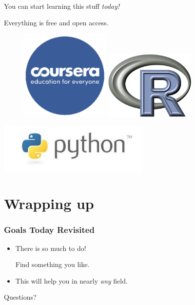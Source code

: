 \documentclass{beamer}
\begin{document}
\begin{frame}


You can start learning this stuff \emph{today!}

Everything is free and open access.

\begin{figure}
   \includegraphics[width=0.4\textwidth]{figs/coursera.png}
   \hfill
   \includegraphics[width=0.4\textwidth]{figs/r.png}
\end{figure}

\centerline{\includegraphics[height=1in]{figs/python.jpeg}}

\end{frame}
\section{Wrapping up}
\begin{frame}


\frametitle{Goals Today Revisited}

\begin{itemize}
\item There is so much to do!

Find something you like.

\item This will help you in nearly \emph{any} field.
\end{itemize}


\end{frame}
\begin{frame}


\huge{Questions?}


\end{frame}
\end{document}
